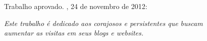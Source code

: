\documentclass[
	12pt,				%
	openright,			%
	twoside,			%
	a4paper,			%
	english,			%
	french,				%
	spanish,			%
	brazil				%
	]{abntex2}
\begin{document}

%
% 
%
\begin{folhadeaprovacao}

  \begin{center}
    {\ABNTEXchapterfont\large\imprimirautor}

    \vspace*{\fill}\vspace*{\fill}
    \begin{center}
      \ABNTEXchapterfont\bfseries\Large\imprimirtitulo
    \end{center}
    \vspace*{\fill}
    
    \hspace{.45\textwidth}
    \begin{minipage}{.5\textwidth}
        \imprimirpreambulo
    \end{minipage}%
    \vspace*{\fill}
   \end{center}
        
   Trabalho aprovado. \imprimirlocal, 24 de novembro de 2012:

      
   \begin{center}
    \vspace*{0.5cm}
    {\large\imprimirlocal}
    \par
    {\large\imprimirdata}
    \vspace*{1cm}
  \end{center}
  
\end{folhadeaprovacao}

\begin{dedicatoria}
   \vspace*{\fill}
   \centering
   \noindent
   \textit{ Este trabalho é dedicado aos corajosos e persistentes que buscam\\ aumentar as visitas em seus blogs e websites.} \vspace*{\fill}
\end{dedicatoria}
\end{document}
